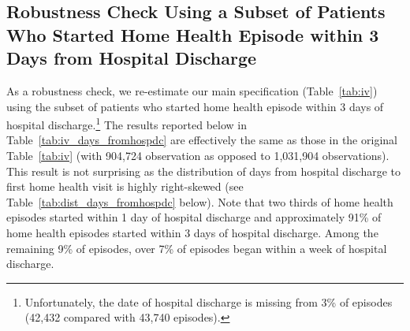 \documentclass[final,12pt, notitlepage]{article}
\begin{document}
\begin{singlespace}
\clearpage
\subsection{Robustness Check Using a Subset of Patients Who Started Home Health Episode within 3 Days from Hospital Discharge} \label{appendix:dist_days_fromhospdc}

As a robustness check, we re-estimate our main specification (Table~\ref{tab:iv}) using the subset of patients who started home health episode within 3 days of hospital discharge.\footnote{Unfortunately, the date of hospital discharge is missing from 3\% of episodes (42,432 compared with 43,740 episodes).} The results reported below in Table~\ref{tab:iv_days_fromhospdc} are effectively the same as those in the original Table~\ref{tab:iv} (with 904,724 observation as opposed to 1,031,904 observations). This result is not surprising as the distribution of days from hospital discharge to first home health visit is highly right-skewed (see Table~\ref{tab:dist_days_fromhospdc} below). Note that two thirds of home health episodes started within 1 day of hospital discharge and approximately 91\% of home health episodes started within 3 days of hospital discharge. Among the remaining 9\% of episodes, over 7\% of episodes began within a week of hospital discharge.
%




\end{singlespace}
\end{document}
